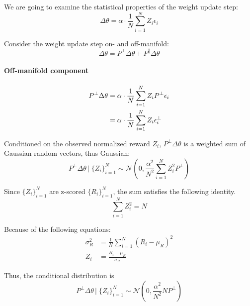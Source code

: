     We are going to examine the statistical properties of the weight update
    step:
    \begin{equation}
    \Delta\theta = \alpha\cdot\frac{1}{N}\sum_{i=1}^{N}Z_{i}\epsilon_{i}
    \end{equation}
    
    Consider the weight update step on- and off-manifold:
    \begin{equation}
    \Delta\theta = P^{\perp}\Delta\theta + P^{\parallel}\Delta\theta
    \end{equation}
    
    
    \paragraph{Off-manifold component}
    \begin{align}
    P^{\perp}\Delta\theta &= \alpha\cdot\frac{1}{N}\sum_{i=1}^{N}Z_{i}P^{\perp}\epsilon_{i} \notag\\
    &= \alpha\cdot\frac{1}{N}\sum_{i=1}^{N}Z_{i}\epsilon_{i}^{\perp}
    \end{align}
    
    Conditioned on the observed normalized reward $Z_{i}$, $P^{\perp}\Delta\theta$
    is a weighted sum of Gaussian random vectors, thus Gaussian:
    \begin{equation}
    P^{\perp}\Delta\theta\,\big|\;\{Z_{i}\}_{i=1}^{N} \sim \mathcal{N}\left(0,\frac{\alpha^{2}}{N^{2}}\sum_{i=1}^{N}Z_{i}^{2}P^{\perp}\right)
    \end{equation}
    
    Since $\{Z_{i}\}_{i=1}^{N}$ are z-scored $\{R_{i}\}_{i=1}^{N}$, the sum satisfies the following identity.%
    \begin{equation}
    \sum_{i=1}^{N}Z_{i}^{2} = N
    \end{equation}
    
    Because of the following equations:
    \begin{align}
    \sigma_{R}^{2} &= \frac{1}{N}\sum_{i=1}^{N}(R_{i}-\mu_{R})^{2}\\
    Z_{i} &= \frac{R_{i}-\mu_{R}}{\sigma_{R}}
    \end{align}
    
    Thus, the conditional distribution is
    \begin{equation}
    P^{\perp}\Delta\theta\,\big|\;\{Z_{i}\}_{i=1}^{N} \sim \mathcal{N}\left(0, \frac{\alpha^{2}}{N^{2}} N P^{\perp}\right)
    \end{equation}
    
